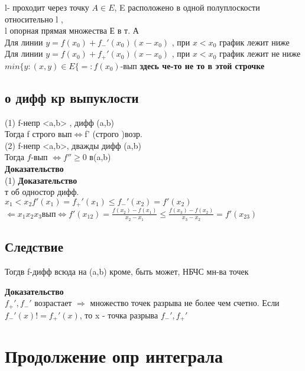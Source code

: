 \documentclass[12pt, a4paper]{article}
\begin{document}
 
l- проходит через точку $A \in E$, E расположено в одной полуплоскости относительно l ,\\
l опорная прямая множества Е в т. А\\
Для линии $y=f(x_0)+f_-'(x_0)(x-x_0)$ , при $x<x_0$ график лежит ниже  \\
Для линии $y=f(x_0)+f_+'(x_0)(x-x_0)$ , при $x<x_0$ график лежит не ниже \\
  $min\lbrace y:(x,y)\in E \lbrace =: f(x_0) $-вып \textbf{здесь че-то не то в этой строчке} \\
   \subsection{о дифф кр выпуклости}
  (1) f-непр <a,b> , дифф (a,b) \\
  Тогда  f  строго вып$ \Longleftrightarrow $f' (строго )возр. \\
  
  (2) f-непр <a,b>, дважды дифф (a,b) \\
  Тогда $f$-вып  $\Longleftrightarrow f'' \geq 0$ в(a,b) \\
  
    \textbf{Доказательство} \\
    (1)   \textbf{Доказательство} \\ т об одностор дифф. \\
  $ x_1<x_2 f'(x_1)=f_+'(x_1)\leq  f_-'(x_2)=f'(x_2)$ \\
  $ \Leftarrow x_1 x_2 x_3 вып \Longleftrightarrow   f'(x_{12})=\frac{f(x_2)-f(x_1)}{x_2-x_1} \leq  \frac{f(x_3)-f(x_2)}{x_3-x_2}=f'(x_{23})$ \\
   
    \subsection{Следствие}
    Тогдв f-дифф всюда на (a,b) кроме, быть может,  НБЧС  мн-ва точек
    
     \textbf{Доказательство} \\
    $f_+', f_-'$ возрастает $\Rightarrow$ множество точек разрыва не более чем счетно. Если $f_-'(x) != f_+'(x)$, то x - точка разрыва  $f_-',f_+'$ \\
     
\section{Продолжение опр интеграла}
    
\end{document}
